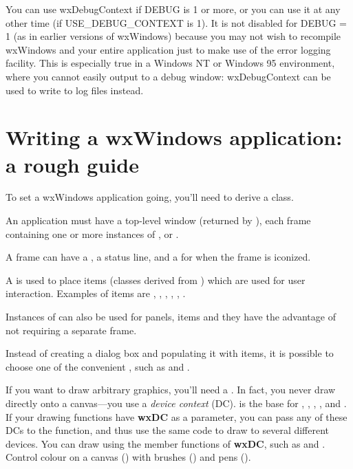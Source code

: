 You can use wxDebugContext if DEBUG is 1 or more, or you can use it
at any other time (if USE\_DEBUG\_CONTEXT is 1). It is not disabled
for DEBUG = 1 (as in earlier versions of wxWindows) because you
may not wish to recompile wxWindows and your entire application
just to make use of the error logging facility. This is especially
true in a Windows NT or Windows 95 environment, where you cannot
easily output to a debug window: wxDebugContext can be used to
write to log files instead.


%

\section{Writing a wxWindows application: a rough guide}\label{roughguide}

To set a wxWindows application going, you'll need to derive a  class.

An application must have a top-level  window (returned by ),
each frame containing one or more instances of , \rtfsp
or .

A frame can have a , a status line, and a  for
when the frame is iconized.

A  is used to place items (classes derived from )
which are used for user interaction. Examples of items are ,
\rtfsp{}, , , ,
\rtfsp{}.

Instances of  can also be used for panels, items and they have
the advantage of not requiring a separate frame.

Instead of creating a dialog box and populating it with items, it is possible to choose
one of the convenient , such as \rtfsp
and .

If you want to draw arbitrary graphics, you'll need a . In fact,
you never draw directly onto a canvas---you use a {\it device context} (DC).  is
the base for , , ,
\rtfsp{},  and .
If your drawing functions have {\bf wxDC} as a parameter, you can pass any of these DCs
to the function, and thus use the same code to draw to several different devices.
You can draw using the member functions of {\bf wxDC}, such as \rtfsp
and . Control colour on a canvas () with
brushes () and pens ().

